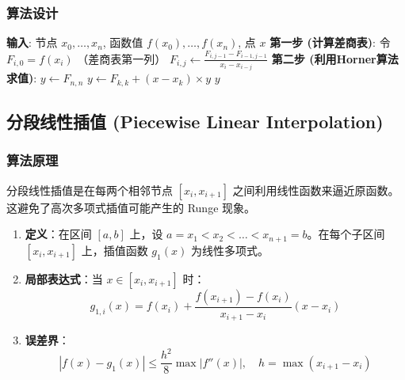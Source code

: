 \documentclass{article}
\begin{document}
\subsubsection{算法设计}
\begin{algorithm}[H]
\caption{计算牛顿插值多项式}
\begin{algorithmic}[1]
    \STATE \textbf{输入}: 节点 $x_0, \dots, x_n$, 函数值 $f(x_0), \dots, f(x_n)$, 点 $x$
    \STATE \textbf{第一步 (计算差商表)}: 
    \STATE 令 $F_{i,0} = f(x_i)$ （差商表第一列）
            \STATE $F_{i,j} \leftarrow \frac{F_{i,j-1} - F_{i-1,j-1}}{x_i - x_{i-j}}$
        \ENDFOR
    \ENDFOR
    \STATE \textbf{第二步 (利用Horner算法求值)}:
    \STATE $y \leftarrow F_{n,n}$
        \STATE $y \leftarrow F_{k,k} + (x - x_k) \times y$
    \ENDFOR
    \RETURN $y$
\end{algorithmic}
\end{algorithm}

\subsection{分段线性插值 (Piecewise Linear Interpolation)}

\subsubsection{算法原理}
分段线性插值是在每两个相邻节点 $[x_i, x_{i+1}]$ 之间利用线性函数来逼近原函数。这避免了高次多项式插值可能产生的 Runge 现象。

\begin{enumerate}
    \item \textbf{定义}：在区间 $[a, b]$ 上，设 $a = x_1 < x_2 < \dots < x_{n+1} = b$。在每个子区间 $[x_i, x_{i+1}]$ 上，插值函数 $g_1(x)$ 为线性多项式。
    
    \item \textbf{局部表达式}：当 $x \in [x_i, x_{i+1}]$ 时：
    \begin{equation}
    g_{1,i}(x) = f(x_i) + \frac{f(x_{i+1}) - f(x_i)}{x_{i+1} - x_i}(x - x_i)
    \end{equation}
    
    \item \textbf{误差界}：
    \begin{equation}
    |f(x) - g_1(x)| \le \frac{h^2}{8} \max |f''(x)|, \quad h = \max(x_{i+1} - x_i)
    \end{equation}
\end{enumerate}
\end{document}

